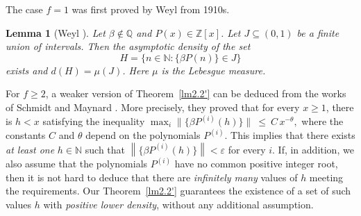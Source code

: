 \documentclass[11pt]{article}
\newtheorem{remark}[theorem]{Remark}
\newtheorem{lemma}[theorem]{Lemma}
\def\Q{\mathbb{Q}}
\theoremstyle{definition}
\begin{document}
The case $f=1$ was first proved by Weyl from 1910s.
\begin{lemma}[Weyl \cite{Hweyl1, Hweyl2}]
Let $\beta \notin \Q$ and $P(x) \in \mathbb{Z}[x]$. Let $J \subseteq (0,1)$ be a finite union of intervals. Then the asymptotic density of the set
\[
H = \{n \in \mathbb{N} : \{\beta P(n)\} \in J\}
\]
exists and $d(H) = \mu(J)$. Here $\mu$ is the Lebesgue measure.
\end{lemma}
For $f \geq 2$, a weaker version of Theorem~\ref{lm2.2'} can be deduced from the works of Schmidt \cite{schmidt} and Maynard \cite{JM}. More precisely, they proved that 
for every $x\ge1$, there is $h<x$ satisfying the inequality \;
$\max_i\big\|\{\beta P^{(i)}(h)\}\big\|\ \le\ C\,x^{-\theta},$
where the constants $C$ and $\theta$ depend on the polynomials $P^{(i)}$. This implies that there exists \emph{at least one} $h \in \mathbb{N}$ such that
$\left\| \{\beta P^{(i)}(h)\} \right\| < \varepsilon$ for every $i$.
If, in addition, we also assume that the polynomials $P^{(i)}$ have no common positive integer root, then it is not hard to deduce that there are \emph{infinitely many} values of $h$ meeting the requirements. Our Theorem~\ref{lm2.2'} guarantees the existence of a set of such values $h$ with \emph{positive lower density}, without any additional assumption.
\smallskip
\end{document}
